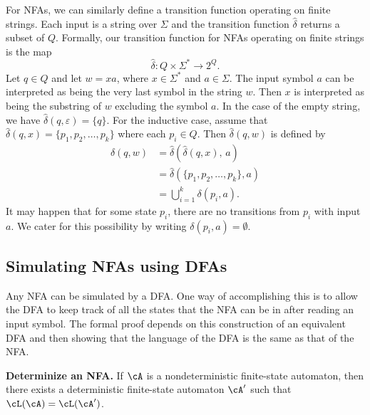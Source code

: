 For NFAs, we can similarly define a transition function operating on
finite strings. Each input is a string over $\Sigma$ and the
transition function $\hat{\delta}$ returns a subset of $Q$. Formally,
our transition function for NFAs operating on finite strings is the
map
\[
\hat{\delta} : Q \times \Sigma^\ast \to 2^Q.
\]
Let $q \in Q$ and let $w = xa$, where $x \in \Sigma^\ast$ and
$a \in \Sigma$. The input symbol $a$ can be interpreted as being the
very last symbol in the string $w$. Then $x$ is interpreted as being the
substring of $w$ excluding the symbol $a$. In the case of the empty
string, we have $\hat{\delta}(q, \varepsilon) = \{q\}$. For the
inductive case, assume that
$\hat{\delta}(q, x) = \{p_1, p_2, \dots, p_k\}$ where each
$p_i \in Q$. Then $\hat{\delta}(q, w)$ is defined by
\begin{align*}
\hat{\delta}(q,w)
&=
\hat{\delta} \left( \hat{\delta}(q,x),\, a \right) \\[4pt]
&=
\hat{\delta} \left( \{p_1, p_2, \dots, p_k\}, a \right) \\[4pt]
&=
\bigcup_{i=1}^k \delta (p_i, a).
\end{align*}
It may happen that for some state $p_i$, there are no transitions from
$p_i$ with input $a$. We cater for this possibility by writing
$\delta(p_i, a) = \emptyset$.



\subsection{Simulating NFAs using DFAs}

Any NFA can be simulated by a DFA. One way of accomplishing this is to
allow the DFA to keep track of all the states that the NFA can be in
after reading an input symbol. The formal proof depends on this
construction of an equivalent DFA and then showing that the language
of the DFA is the same as that of the NFA.

\begin{theorem}
\label{thm:introduction:determinize_NFA}
\textbf{Determinize an NFA.}
If $\cA$ is a nondeterministic finite-state automaton, then there
exists a deterministic finite-state automaton $\cA^\prime$ such that
$\cL(\cA) = \cL(\cA^\prime)$.
\end{theorem}

